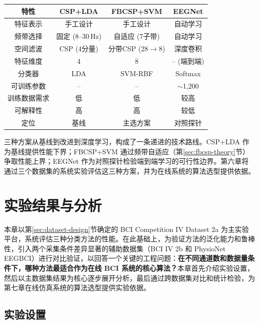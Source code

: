 \begin{table}[htbp]
	\centering
	\begin{tabular}{cccc}
		\toprule
		特性 & CSP+LDA & FBCSP+SVM & EEGNet \\
		\midrule
		特征表示 & 手工设计 & 手工设计 & 自动学习 \\
		频带选择 & 固定 (8--30\,Hz) & 自适应 (7子带) & 自动学习 \\
		空间滤波 & CSP (4分量) & 分带CSP (28$\to$8) & 深度卷积 \\
		特征维度 & 4 & 8 & -- (端到端) \\
		分类器 & LDA & SVM-RBF & Softmax \\
		可训练参数 & -- & -- & $\sim$1,200 \\
		训练数据需求 & 低 & 低 & 较高 \\
		可解释性 & 高 & 高 & 较低 \\
		定位 & 基线 & 主选方案 & 对照探针 \\
		\bottomrule
	\end{tabular}
\end{table}

三种方案从基线到改进到深度学习，构成了一条递进的技术路线。CSP+LDA 作为基线提供性能下界；FBCSP+SVM 通过频带自适应（第\ref{sec:fbcsp-theory}节）争取性能上界；EEGNet 作为对照探针检验端到端学习的可行性边界。第六章将通过三个数据集的系统实验评估这三种方案，并为在线系统的算法选型提供依据。


\section{实验结果与分析}

本章以第\ref{sec:dataset-design}节确定的 BCI Competition IV Dataset 2a 为主实验平台，系统评估三种分类方法的性能。在此基础上，为验证方法的泛化能力和鲁棒性，引入两个采集条件差异显著的辅助数据集（BCI IV 2b 和 PhysioNet EEGBCI）进行对比验证，以回答一个关键的工程问题：\textbf{在不同通道数和数据量条件下，哪种方法最适合作为在线 BCI 系统的核心算法？}本章首先介绍实验设置，然后以主数据集结果为核心逐步展开分析，最后通过跨数据集对比和统计检验，为第七章在线仿真系统的算法选型提供实验依据。

\subsection{实验设置}


